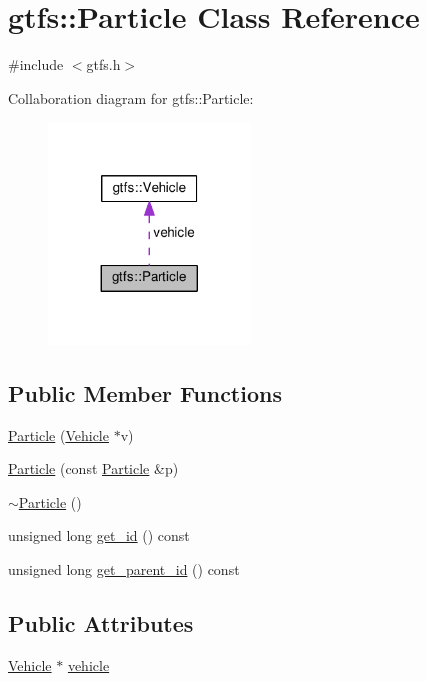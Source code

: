\hypertarget{classgtfs_1_1Particle}{}\section{gtfs\+:\+:Particle Class Reference}
\label{classgtfs_1_1Particle}


{\ttfamily \#include $<$gtfs.\+h$>$}



Collaboration diagram for gtfs\+:\+:Particle\+:
\nopagebreak
\begin{figure}[H]
\begin{center}
\leavevmode
\includegraphics[width=152pt]{classgtfs_1_1Particle__coll__graph}
\end{center}
\end{figure}
\subsection*{Public Member Functions}
\begin{DoxyCompactItemize}
\item 
\hyperlink{classgtfs_1_1Particle_ad7f42e77c6c7f3042c977fd5a42ff82f}{Particle} (\hyperlink{classgtfs_1_1Vehicle}{Vehicle} $\ast$v)
\item 
\hyperlink{classgtfs_1_1Particle_ac386e64b43b1e317063f9a6666d604ce}{Particle} (const \hyperlink{classgtfs_1_1Particle}{Particle} \&p)
\item 
\hyperlink{classgtfs_1_1Particle_a3accf3496ad8460b4ad8b3f6da2de411}{$\sim$\+Particle} ()
\item 
unsigned long \hyperlink{classgtfs_1_1Particle_aff52b6b5e4c8f845f8ab3eefe766c365}{get\+\_\+id} () const 
\item 
unsigned long \hyperlink{classgtfs_1_1Particle_a4f103db764459e99f6427f8a4ca50b1f}{get\+\_\+parent\+\_\+id} () const 
\end{DoxyCompactItemize}
\subsection*{Public Attributes}
\begin{DoxyCompactItemize}
\item 
\hyperlink{classgtfs_1_1Vehicle}{Vehicle} $\ast$ \hyperlink{classgtfs_1_1Particle_a81c313d505ecb592d79463f167dfb76c}{vehicle}
\end{DoxyCompactItemize}



